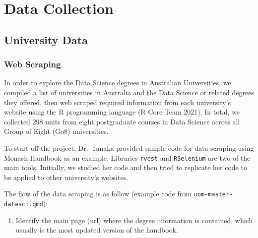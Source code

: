 \documentclass[
  letterpaper,
]{report}
\newenvironment{Shaded}{\begin{snugshade}}{\end{snugshade}}
\newcommand{\DecValTok}[1]{\textcolor[rgb]{0.68,0.00,0.00}{#1}}
\newcommand{\FunctionTok}[1]{\textcolor[rgb]{0.28,0.35,0.67}{#1}}
\newcommand{\NormalTok}[1]{\textcolor[rgb]{0.00,0.23,0.31}{#1}}
\newcommand{\OtherTok}[1]{\textcolor[rgb]{0.00,0.23,0.31}{#1}}
\newcommand{\SpecialCharTok}[1]{\textcolor[rgb]{0.37,0.37,0.37}{#1}}
\newcommand{\StringTok}[1]{\textcolor[rgb]{0.13,0.47,0.30}{#1}}
\providecommand{\tightlist}{%
  \setlength{\itemsep}{0pt}\setlength{\parskip}{0pt}}\usepackage{longtable,booktabs,array}
\begin{document}
\part{Data Collection}

\hypertarget{sec-unidata}{%
\chapter{University Data}\label{sec-unidata}}

\hypertarget{web-scraping}{%
\section{Web Scraping}\label{web-scraping}}

In order to explore the Data Science degrees in Australian Universities,
we compiled a list of universities in Australia and the Data Science or
related degrees they offered, then web scraped required information from
each university's website using the R programming language (R Core Team
2021). In total, we collected 298 units from eight postgraduate courses
in Data Science across all Group of Eight (Go8) universities.

To start off the project, Dr.~Tanaka provided sample code for data
scraping using Monash Handbook as an example. Libraries \texttt{rvest}
and \texttt{RSelenium} are two of the main tools. Initially, we studied
her code and then tried to replicate her code to be applied to other
university's websites.

The flow of the data scraping is as follow (example code from
\texttt{uom-master-datasci.qmd}):

\begin{enumerate}
\def\labelenumi{\arabic{enumi}.}
\tightlist
\item
  Identify the main page (url) where the degree information is
  contained, which usually is the most updated version of the handbook.
\end{enumerate}

\begin{Shaded}
\end{Shaded}
\end{document}
